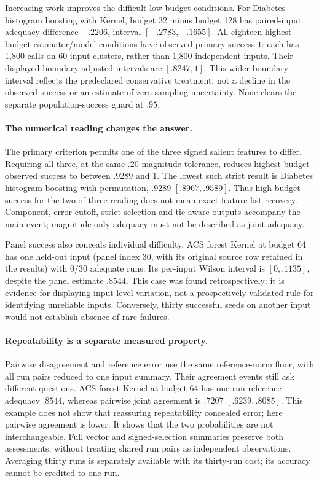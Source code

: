 Increasing work improves the difficult low-budget conditions. For Diabetes histogram boosting with Kernel, budget 32 minus budget 128 has paired-input adequacy difference $-.2206$, interval $[-.2783,-.1655]$. All eighteen highest-budget estimator/model conditions have observed primary success $1$: each has 1,800 calls on 60 input clusters, rather than 1,800 independent inputs. Their displayed boundary-adjusted intervals are $[.8247,1]$. This wider boundary interval reflects the predeclared conservative treatment, not a decline in the observed success or an estimate of zero sampling uncertainty. None clears the separate population-success guard at $.95$.

\paragraph{The numerical reading changes the answer.}
The primary criterion permits one of the three signed salient features to differ. Requiring all three, at the same $.20$ magnitude tolerance, reduces highest-budget observed success to between $.9289$ and $1$. The lowest such strict result is Diabetes histogram boosting with permutation, $.9289$ $[.8967,.9589]$. Thus high-budget success for the two-of-three reading does not mean exact feature-list recovery. Component, error-cutoff, strict-selection and tie-aware outputs accompany the main event; magnitude-only adequacy must not be described as joint adequacy.

Panel success also conceals individual difficulty. ACS forest Kernel at budget 64 has one held-out input (panel index 30, with its original source row retained in the results) with 0/30 adequate runs. Its per-input Wilson interval is $[0,.1135]$, despite the panel estimate $.8544$. This case was found retrospectively; it is evidence for displaying input-level variation, not a prospectively validated rule for identifying unreliable inputs. Conversely, thirty successful seeds on another input would not establish absence of rare failures.

\paragraph{Repeatability is a separate measured property.}
Pairwise disagreement and reference error use the same reference-norm floor, with all run pairs reduced to one input summary. Their agreement events still ask different questions. ACS forest Kernel at budget 64 has one-run reference adequacy $.8544$, whereas pairwise joint agreement is $.7207$ $[.6239,.8085]$. This example does not show that reassuring repeatability concealed error; here pairwise agreement is lower. It shows that the two probabilities are not interchangeable. Full vector and signed-selection summaries preserve both assessments, without treating shared run pairs as independent observations. Averaging thirty runs is separately available with its thirty-run cost; its accuracy cannot be credited to one run.

